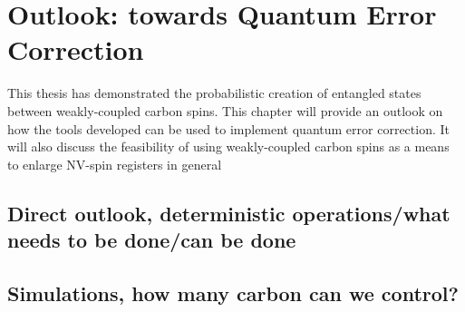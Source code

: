 \chapter{Outlook: towards Quantum Error Correction}
This thesis has demonstrated the probabilistic creation of entangled states between weakly-coupled carbon spins.
This chapter will provide an outlook on how the tools developed can be used to implement quantum error correction.
It will also discuss the feasibility of using weakly-coupled carbon spins as a means to enlarge NV-spin registers in general

\section{Direct outlook, deterministic operations/what needs to be done/can be done}

\section{Simulations, how many carbon can we control? }
